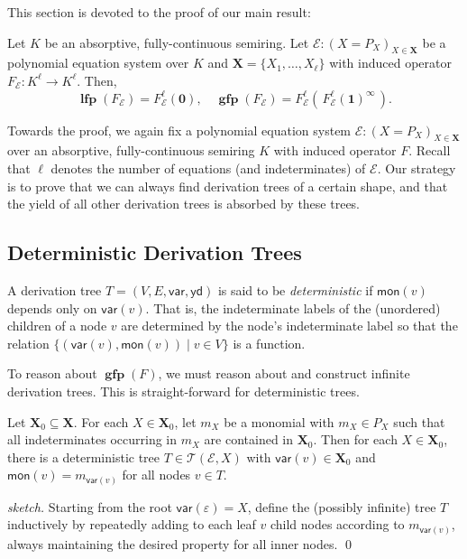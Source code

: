 \documentclass[english,runningheads,a4paper,envcountsame]{llncs}
\newenvironment{Definition}{\definition\upshape}{\enddefinition}
\DeclareMathOperator{\lfp}{\mathbf{lfp}}
\DeclareMathOperator{\gfp}{\mathbf{gfp}}
\newcommand*{\XX}{{\bm X}}
\newcommand*{\EE}{\mathcal{E}}
\renewcommand*{\root}{\varepsilon}
\newcommand*{\yield}{\mathsf{yd}}
\newcommand*{\mon}{\mathsf{mon}}
\newcommand*{\var}{\mathsf{var}}
\newcommand*{\Trees}{\mathcal{T}}
\newcommand{\zero}{\tup 0}
\newcommand{\one}{\tup 1}
\newcommand*{\co}{\colon}
\newcommand*{\tup}[1]{\mathbf{#1}}
\begin{document}
This section is devoted to the proof of our main result:

\setcounter{backuptheorem}{\value{theorem}}
\setcounter{theorem}{0}
\begin{theorem}\label{thmClosedSolution}
Let $K$ be an absorptive, fully-continuous semiring.
Let $\EE \co (X = P_X)_{X \in \XX}$ be a polynomial equation system over $K$ and $\XX = \{X_1,\dots,X_\ell\}$ with induced operator $F_\EE \co K^\ell \to K^\ell$.
Then,
\[
    \lfp(F_\EE) = F_\EE^\ell(\zero),\quad
    \gfp(F_\EE) = F_\EE^\ell( \, F_\EE^\ell(\one)^\infty \,).
\]
\end{theorem}
\setcounter{theorem}{\value{backuptheorem}}


Towards the proof, we again fix a polynomial equation system $\EE \co (X = P_X)_{X \in \XX}$ over an absorptive, fully-continuous semiring $K$ with induced operator $F$.
Recall that $\ell$ denotes the number of equations (and indeterminates) of $\EE$.
Our strategy is to prove that we can always find derivation trees of a certain shape, and that the yield of all other derivation trees is absorbed by these trees.


\subsection{Deterministic Derivation Trees}

\begin{Definition}
A derivation tree $T = (V, E, \var, \yield)$ is said to be \emph{deterministic} if $\mon(v)$ depends only on $\var(v)$.
That is, the indeterminate labels of the (unordered) children of a node $v$ are determined by the node's indeterminate label so that the relation $\{ (\var(v), \mon(v)) \mid v \in V \}$ is a function.
\end{Definition}

To reason about $\gfp(F)$, we must reason about and construct infinite derivation trees.
This is straight-forward for deterministic trees.

\begin{lemma}\label{lemDeterministicConstruction}
Let $\XX_0 \subseteq \XX$.
For each $X \in \XX_0$, let $m_X$ be a monomial with $m_X \in P_X$ such that all indeterminates occurring in $m_X$ are contained in $\XX_0$.
Then for each $X \in \XX_0$, there is a deterministic tree $T \in \Trees(\EE, X)$ with $\var(v) \in \XX_0$ and $\mon(v) = m_{\var(v)}$ for all nodes $v \in T$.
\end{lemma}
\begin{proof}[sketch]
Starting from the root $\var(\root)=X$, define the (possibly infinite) tree $T$ inductively by repeatedly adding to each leaf $v$ child nodes according to $m_{\var(v)}$, always maintaining the desired property for all inner nodes. \qed
\end{proof}
\end{document}
